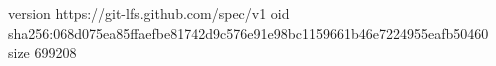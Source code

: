 version https://git-lfs.github.com/spec/v1
oid sha256:068d075ea85ffaefbe81742d9c576e91e98bc1159661b46e7224955eafb50460
size 699208
